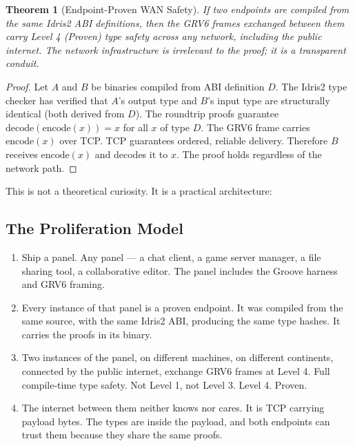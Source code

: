\documentclass[11pt,a4paper]{article}
\newtheorem{theorem}{Theorem}
\begin{document}
\begin{theorem}[Endpoint-Proven WAN Safety]
If two endpoints are compiled from the same Idris2 ABI definitions, then
the GRV6 frames exchanged between them carry Level 4 (Proven) type
safety across any network, including the public internet. The network
infrastructure is irrelevant to the proof; it is a transparent conduit.
\end{theorem}

\begin{proof}
Let $A$ and $B$ be binaries compiled from ABI definition $D$. The Idris2
type checker has verified that $A$'s output type and $B$'s input type are
structurally identical (both derived from $D$). The roundtrip proofs
guarantee $\text{decode}(\text{encode}(x)) = x$ for all $x$ of type $D$.
The GRV6 frame carries $\text{encode}(x)$ over TCP. TCP guarantees
ordered, reliable delivery. Therefore $B$ receives $\text{encode}(x)$
and decodes it to $x$. The proof holds regardless of the network path.
\end{proof}

This is not a theoretical curiosity. It is a practical architecture:

\subsection{The Proliferation Model}

\begin{enumerate}
\item Ship a panel. Any panel --- a chat client, a game server manager, a
  file sharing tool, a collaborative editor. The panel includes the
  Groove harness and GRV6 framing.

\item Every instance of that panel is a proven endpoint. It was compiled
  from the same source, with the same Idris2 ABI, producing the same
  type hashes. It carries the proofs in its binary.

\item Two instances of the panel, on different machines, on different
  continents, connected by the public internet, exchange GRV6 frames
  at Level 4. Full compile-time type safety. Not Level 1, not Level 3.
  Level 4. Proven.

\item The internet between them neither knows nor cares. It is TCP
  carrying payload bytes. The types are inside the payload, and both
  endpoints can trust them because they share the same proofs.
\end{enumerate}
\end{document}
